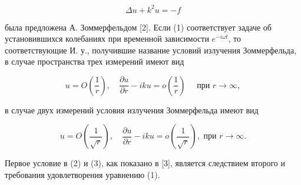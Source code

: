 \documentclass[10pt]{article}
\begin{document}
\[

\Delta u+k^{2} u=-f

\]



была предложена А. Зоммерфельдом [2]. Если (1) соответствует задаче об установившихся колебаниях при временной зависимости $e^{-i \omega t}$, то соответствующие И. у., получившие название условий излучения Зоммерфельда, в случае пространства трех измерений имеют вид



\[

u=O\left(\frac{1}{r}\right), \quad \frac{\partial u}{\partial r}-i k u=o\left(\frac{1}{r}\right) \quad \text { при } r \rightarrow \infty,

\]



в случае двух измерений условия излучения Зоммерфельда имеют вид



\[

u=O\left(\frac{1}{\sqrt{r}}\right), \quad \frac{\partial u}{\partial r}-i k u=o\left(\frac{1}{\sqrt{r}}\right), \text { при } r \rightarrow \infty .

\]



Первое условие в (2) и (3), как показано в [3], является следствием второго и требования удовлетворения уравнению (1).
\end{document}
